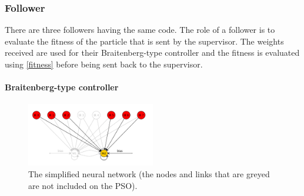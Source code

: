 \documentclass[a4, 10 pt, conference]{ieeeconf}  %
\begin{document}
\subsubsection{Follower}
There are three followers having the same code. The role of a follower is to evaluate the fitness of the particle that is sent by the supervisor. The weights received are used for their Braitenberg-type controller and the fitness is evaluated using \ref{fitness} before being sent back to the supervisor.

\paragraph{Braitenberg-type controller}

\begin{figure}[thpb]
      \centering
      \includegraphics[width = 0.5\textwidth]{images/NNsimplified.png}
      \caption{The simplified neural network (the nodes and links that are greyed are not included on the PSO).}
      \label{fig:nnsimplified}
   \end{figure}
\end{document}
